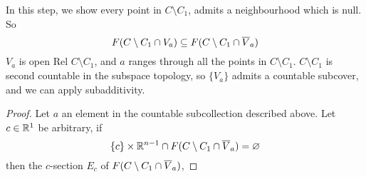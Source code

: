 \documentclass[../main-manifolds.tex]{subfiles}
\begin{document}
\begin{step}\label{lee-sards-case1-neighbourhoods}
    In this step, we show every point in $C\setminus C_1$, admits a neighbourhood which is null. So
    \[
        F(C\setminus C_1 \cap V_a)\subseteq F(C\setminus C_1\cap \overline{V}_a)
    \]
    $V_a$ is open Rel $C\setminus C_1$, and $a$ ranges through all the points in $C\setminus C_1$. $C\setminus C_1$ is second countable in the subspace topology, so $\{V_a\}$ admits a countable subcover, and we can apply subadditivity.
\end{step}
\begin{proof}
    Let $a$ an element in the countable subcollection described above. Let $c\in\mathbb{R}^{1}$ be arbitrary, if
    \[
        \{c\}\times\mathbb{R}^{n-1}\cap F(C\setminus C_1\cap \overline{V}_a)=\varnothing
    \]
    then the $c$-section $E_c$ of $F(C\setminus C_1\cap \overline{V}_a)$, 
    

\end{proof}
\end{document}
